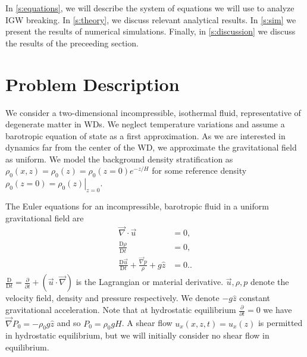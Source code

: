 \documentclass[
        fleqn,
        usenatbib,
    ]{mnras}
\newcommand*{\pd}[2]{\frac{\partial#1}{\partial#2}}
\newcommand*{\md}[2]{\frac{\mathrm{D}#1}{\mathrm{D}#2}}
\newcommand*{\at}[1]{\left.#1\right|}
\newcommand*{\p}[1]{\left(#1\right)}
\begin{document}

In \autoref{s:equations}, we will describe the system of equations we will
use to analyze IGW breaking. In \autoref{s:theory}, we discuss relevant
analytical results. In \autoref{s:sim} we present the results of numerical
simulations. Finally, in \autoref{s:discussion} we discuss the results of the
preceeding section.

\section{Problem Description}\label{s:equations}



We consider a two-dimensional incompressible, isothermal fluid, representative
of degenerate matter in WDs. We neglect temperature variations and assume a
barotropic equation of state as a first approximation. As we are interested in
dynamics far from the center of the WD, we approximate the gravitational field
as uniform. We model the background density stratification as $\rho_0(x, z) =
\rho_0(z) = \rho_0(z=0) e^{-z/H}$ for some reference density $\rho_0(z=0) =
\at{\rho_0(z)}_{z = 0}$.

The Euler equations for an incompressible, barotropic fluid in a uniform
gravitational field are
\begin{subequations}\label{se:nl_orig}
    \begin{align}
        \vec{\nabla} \cdot \vec{u} &= 0,\label{eq:nl_incomp}\\
        \md{\rho}{t} &= 0 ,\label{eq:nl_density}\\
        \md{\vec{u}}{t} + \frac{\vec{\nabla}p}{\rho} + g\hat{z} &=
            0.\label{eq:nl_mom}.
    \end{align}
\end{subequations}
$\md{}{t} = \pd{}{t} + \p{\vec{u} \cdot \vec{\nabla}}$ is the Lagrangian or
material derivative. $\vec{u}, \rho, p$ denote the velocity field, density and
pressure respectively. We denote $-g\hat{z}$ constant gravitational
acceleration. Note that at hydrostatic equilibrium $\pd{}{t} = 0$ we have
$\vec{\nabla}P_0 = -\rho_0 g\hat{z}$ and so $P_0 = \rho_0 gH$. A shear flow
$u_x(x, z, t) = u_x(z)$ is permitted in hydrostatic equilibrium, but we will
initially consider no shear flow in equilibrium.
\end{document}
